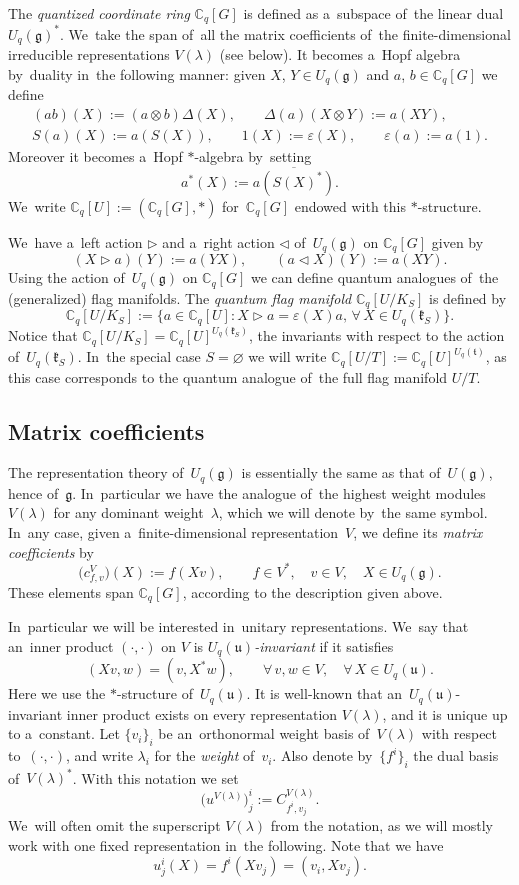 \documentclass[10pt,a4paper]{amsart}
\numberwithin{equation}{section}
\newcommand{\lieg}{\mathfrak{g}}
\newcommand{\Uqg}{U_q(\mathfrak{g})}
\newcommand{\Uqt}{U_q(\mathfrak{t})}
\newcommand{\Uqu}{U_q(\mathfrak{u})}
\newcommand{\UqkS}{U_q(\mathfrak{k}_S)}
\newcommand{\CqG}{\mathbb{C}_q[G]}
\newcommand{\CqU}{\mathbb{C}_q[U]}
\newcommand{\Cqflag}{\mathbb{C}_q[U / K_S]}
\newcommand{\Cqfullflag}{\mathbb{C}_q[U /T]}
\begin{document}
The \emph{quantized coordinate ring} $\CqG$ is defined as a~subspace of~the linear dual $\Uqg^*$.
We~take the span of~all the matrix coefficients of~the finite-dimensional irreducible representations $V(\lambda)$ (see below).
It becomes a~Hopf algebra by~duality in~the following manner: given $X$, $Y \in \Uqg$ and $a$, $b \in \CqG$ we define
\begin{gather*}
(a b)(X) := (a \otimes b) \Delta(X), \qquad
\Delta(a) (X \otimes Y) := a(X Y),
\\
S(a)(X) := a(S(X)), \qquad
1(X) := \varepsilon(X), \qquad
\varepsilon(a) := a(1).
\end{gather*}
Moreover it becomes a~Hopf $*$-algebra by~setting
\[
a^*(X) := \overline{a(S(X)^*)}.
\]
We~write $\CqU := (\CqG, *)$ for~$\CqG$ endowed with this $*$-structure.

We~have a~left action $\triangleright$ and a~right action $\triangleleft$ of~$\Uqg$ on $\CqG$ given by \[
(X \triangleright a)(Y) := a(Y X), \qquad
(a \triangleleft X)(Y) := a(X Y).
\]
Using the action of~$\Uqg$ on $\CqG$ we can define quantum analogues of~the (generalized) flag manifolds.
The \emph{quantum flag manifold} $\Cqflag$ is defined by
\[
\Cqflag := \{ a\in \CqU\colon X \triangleright a = \varepsilon(X) a, \, \forall\, X \in \UqkS \}.
\]
Notice that $\Cqflag = \CqU^{\UqkS}$, the invariants with respect to the action of~$\UqkS$.
In~the special case $S = \varnothing$ we will write $\Cqfullflag := \CqU^{\Uqt}$, as this case corresponds to the quantum analogue of~the full flag manifold $U / T$.

\subsection{Matrix coefficients}\label{sec:mat-coeff}

The representation theory of~$\Uqg$ is essentially the same as that of~$U(\lieg)$, hence of~$\lieg$.
In~particular we have the analogue of~the highest weight modules~$V(\lambda)$ for any dominant weight~$\lambda$, which we will denote by~the same symbol.
In~any case, given a~finite-dimensional representa\-tion~$V$, we define its \emph{matrix coefficients} by
\[
\big(c^V_{f, v}\big)(X) := f(X v), \qquad f \in V^*, \quad v \in V, \quad X \in \Uqg.
\]
These elements span $\CqG$, according to the description given above.

In~particular we will be interested in~unitary representations.
We~say that an~inner product $(\cdot, \cdot)$ on $V$ is \emph{$\Uqu$-invariant} if it satisfies
\[
(X v, w) = (v, X^* w), \qquad \forall\, v, w \in V, \quad \forall\, X \in \Uqu.
\]
Here we use the $*$-structure of~$\Uqu$.
It is well-known that an~$\Uqu$-invariant inner product exists on every representation $V(\lambda)$, and it is unique up to a~constant.
Let $\{v_i\}_i$ be an~orthonormal weight basis of~$V(\lambda)$ with respect to~$(\cdot, \cdot)$, and write $\lambda_i$ for the \emph{weight} of~$v_i$.
Also denote by~$\{f^i\}_i$ the dual basis of~$V(\lambda)^*$.
With this notation we set
\[
\big(u^{V(\lambda)}\big)^i_j := C^{V(\lambda)}_{f^i, v_j}.
\]
We~will often omit the superscript $V(\lambda)$ from the notation, as we will mostly work with one fixed representation in~the following.
Note that we have
\[
u^i_j(X) = f^i(X v_j) = (v_i, X v_j).
\]
\end{document}
